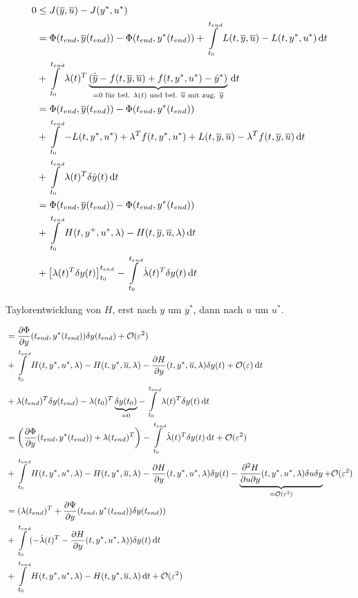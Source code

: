 \begin{align*}
0 & \leq J(\overline y, \overline u) - J(y^*, u^*) \\
&= \Phi({t_{end}}, \overline y({t_{end}})) - \Phi({t_{end}}, y^*({t_{end}})) + \int\limits_{t_0}^{t_{end}} L(t, \overline y, \overline u) - L(t, y^*, u^*) \,\mathrm d t \\
&+ \int\limits_{t_0}^{t_{end}} \lambda(t)^T \underbrace{ (\dot{\overline y} - f(t,\overline y, \overline u) + f(t,y^*, u^*) - \dot y^*) }_{=0 \text{ für bel. } \lambda(t) \text{ und bel. } \overline u \text{ mit zug. } \overline y } \,\mathrm d t \\
&= \Phi({t_{end}}, \overline y({t_{end}})) - \Phi({t_{end}}, y^*({t_{end}})) \\
&+ \int\limits_{t_0}^{t_{end}} -L(t,y^*, u^*) + \lambda^T f(t, y^*, u^*) + L(t, \overline y, \overline u) - \lambda^T f(t, \overline y, \overline u) \,\mathrm d t \\
&+ \int\limits_{t_0}^{t_{end}} \lambda(t)^T \delta \dot y (t) \,\mathrm d t \\
&= \Phi({t_{end}}, \overline y({t_{end}})) - \Phi({t_{end}}, y^*({t_{end}})) \\
&+ \int\limits_{t_0}^{t_{end}} H(t, y^+, u^*, \lambda) - H(t, \overline y, \overline u, \lambda) \,\mathrm d t \\
&+ \left[ \lambda(t)^T \delta y(t) \right]_{t_0}^{t_{end}} - \int\limits_{t_0}^{t_{end}} \dot \lambda(t)^T \delta y(t) \,\mathrm d t \\
\end{align*}

Taylorentwicklung von $H$, erst nach $y$ um $y^*$, dann nach $u$ um $u^*$.

\begin{align*}
&= \frac{\partial \Phi}{\partial y} ({t_{end}}, y^*({t_{end}})) \delta y({t_{end}}) + \mathcal O(\varepsilon^2) \\
&+ \int\limits_{t_0}^{t_{end}} H(t, y^*, u^*, \lambda) - H(t, y^*, \overline u, \lambda) - \frac{\partial H}{\partial y} (t, y^*, \overline u, \lambda) \delta y(t) + \mathcal O(\varepsilon) \,\mathrm d t \\
& + \lambda({t_{end}})^T \delta y({t_{end}}) - \lambda(t_0)^T \underbrace{\delta y (t_0)}_{=0} - \int\limits_{t_0}^{t_{end}} \lambda(t)^T \delta y(t) \,\mathrm d t \\
&= \left( \frac{\partial \Phi}{\partial y} ({t_{end}}, y^*({t_{end}})) + \lambda({t_{end}})^T \right) - \int\limits_{t_0}^{t_{end}} \dot \lambda(t)^T \delta y (t) \,\mathrm d t + \mathcal O(\varepsilon^2) \\
&+ \int\limits_{t_0}^{t_{end}} H(t, y^*, u^*, \lambda)- H(t, y^*, \overline u, \lambda) - \frac{\partial H}{\partial y} (t, y^*, u^*, \lambda) \delta y(t) - \underbrace{\frac{\partial^2 H}{\partial u\partial y} (t, y^*, u^*, \lambda) \delta u \delta y}_{= \mathcal O(\varepsilon^2)} + \mathcal O(\varepsilon^2) \\
&= (\lambda({t_{end}})^T + \frac{\partial \Psi}{\partial y} ({t_{end}}, y^*({t_{end}})) \delta y({t_{end}})) \\
& + \int\limits_{t_0}^{t_{end}} (-\dot \lambda(t)^T - \frac{\partial H}{\partial y} (t, y^*, u^*, \lambda)) \delta y(t) \,\mathrm d t \\
& + \int\limits_{t_0}^{t_{end}} H(t, y^*, u^*, \lambda) - H(t, y^*, \overline u, \lambda) \,\mathrm d t + \mathcal O(\varepsilon^2) 
\end{align*}

